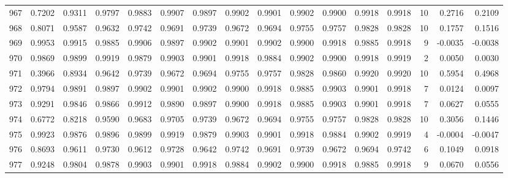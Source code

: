 \begin{tabular}{lrrrrrrrrrrrrrrr}
967 &      0.7202 &  0.9311 &  0.9797 &  0.9883 &  0.9907 &  0.9897 &  0.9902 &  0.9901 &  0.9902 &  0.9900 &   0.9918 &     0.9918 &     10 &                    0.2716 &                     0.2109 \\
968 &      0.8071 &  0.9587 &  0.9632 &  0.9742 &  0.9691 &  0.9739 &  0.9672 &  0.9694 &  0.9755 &  0.9757 &   0.9828 &     0.9828 &     10 &                    0.1757 &                     0.1516 \\
969 &      0.9953 &  0.9915 &  0.9885 &  0.9906 &  0.9897 &  0.9902 &  0.9901 &  0.9902 &  0.9900 &  0.9918 &   0.9885 &     0.9918 &      9 &                   -0.0035 &                    -0.0038 \\
970 &      0.9869 &  0.9899 &  0.9919 &  0.9879 &  0.9903 &  0.9901 &  0.9918 &  0.9884 &  0.9902 &  0.9900 &   0.9918 &     0.9919 &      2 &                    0.0050 &                     0.0030 \\
971 &      0.3966 &  0.8934 &  0.9642 &  0.9739 &  0.9672 &  0.9694 &  0.9755 &  0.9757 &  0.9828 &  0.9860 &   0.9920 &     0.9920 &     10 &                    0.5954 &                     0.4968 \\
972 &      0.9794 &  0.9891 &  0.9897 &  0.9902 &  0.9901 &  0.9902 &  0.9900 &  0.9918 &  0.9885 &  0.9903 &   0.9901 &     0.9918 &      7 &                    0.0124 &                     0.0097 \\
973 &      0.9291 &  0.9846 &  0.9866 &  0.9912 &  0.9890 &  0.9897 &  0.9900 &  0.9918 &  0.9885 &  0.9903 &   0.9901 &     0.9918 &      7 &                    0.0627 &                     0.0555 \\
974 &      0.6772 &  0.8218 &  0.9590 &  0.9683 &  0.9705 &  0.9739 &  0.9672 &  0.9694 &  0.9755 &  0.9757 &   0.9828 &     0.9828 &     10 &                    0.3056 &                     0.1446 \\
975 &      0.9923 &  0.9876 &  0.9896 &  0.9899 &  0.9919 &  0.9879 &  0.9903 &  0.9901 &  0.9918 &  0.9884 &   0.9902 &     0.9919 &      4 &                   -0.0004 &                    -0.0047 \\
976 &      0.8693 &  0.9611 &  0.9730 &  0.9612 &  0.9728 &  0.9642 &  0.9742 &  0.9691 &  0.9739 &  0.9672 &   0.9694 &     0.9742 &      6 &                    0.1049 &                     0.0918 \\
977 &      0.9248 &  0.9804 &  0.9878 &  0.9903 &  0.9901 &  0.9918 &  0.9884 &  0.9902 &  0.9900 &  0.9918 &   0.9885 &     0.9918 &      9 &                    0.0670 &                     0.0556 \\

\end{tabular}
